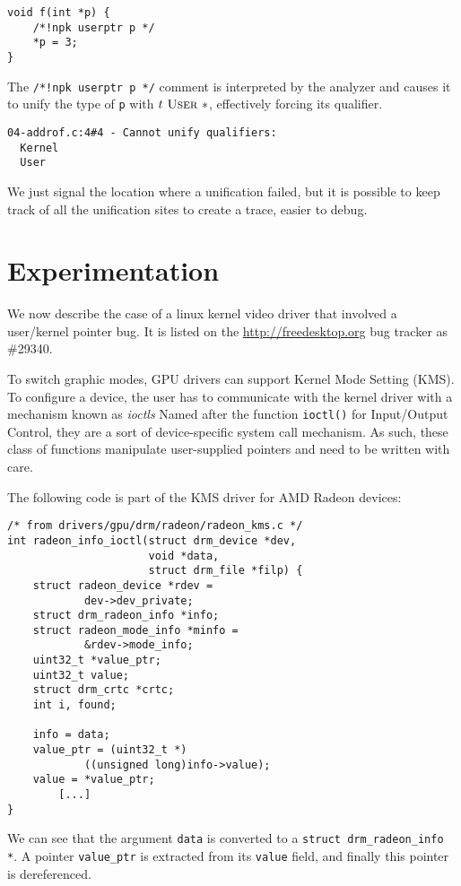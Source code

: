 \begin{verbatim}
void f(int *p) {
    /*!npk userptr p */
    *p = 3;
}
\end{verbatim}

The \texttt{/*!npk userptr p */} comment is interpreted by the analyzer and
causes it to unify the type of \texttt{p} with $t~\textsc{User}~*$, effectively
forcing its qualifier.

\begin{verbatim}
04-addrof.c:4#4 - Cannot unify qualifiers:
  Kernel
  User
\end{verbatim}

We just signal the location where a unification failed, but it is possible to
keep track of all the unification sites to create a trace, easier to debug.

\section{Experimentation}
\label{sec:exp}

We now describe the case of a linux kernel video driver that involved a
user/kernel pointer bug. It is listed on the \url{http://freedesktop.org} bug
tracker as \#29340.

To switch graphic modes, GPU drivers can support Kernel Mode Setting (KMS). To
configure a device, the user has to communicate with the kernel driver with a
mechanism known as \emph{ioctls} Named after the function \texttt{ioctl()} for
Input/Output Control, they are a sort of device-specific system call mechanism.
As such, these class of functions manipulate user-supplied pointers and need to
be written with care.

The following code is part of the KMS driver for AMD Radeon devices:

\begin{verbatim}
/* from drivers/gpu/drm/radeon/radeon_kms.c */
int radeon_info_ioctl(struct drm_device *dev,
                      void *data,
                      struct drm_file *filp) {
	struct radeon_device *rdev =
            dev->dev_private;
	struct drm_radeon_info *info;
	struct radeon_mode_info *minfo =
            &rdev->mode_info;
	uint32_t *value_ptr;
	uint32_t value;
	struct drm_crtc *crtc;
	int i, found;

	info = data;
	value_ptr = (uint32_t *)
            ((unsigned long)info->value);
	value = *value_ptr;
        [...]
}
\end{verbatim}

We can see that the argument \texttt{data} is converted to a \texttt{struct
drm\_radeon\_info *}. A pointer \texttt{value\_ptr} is extracted from its
\texttt{value} field, and finally this pointer is dereferenced.

